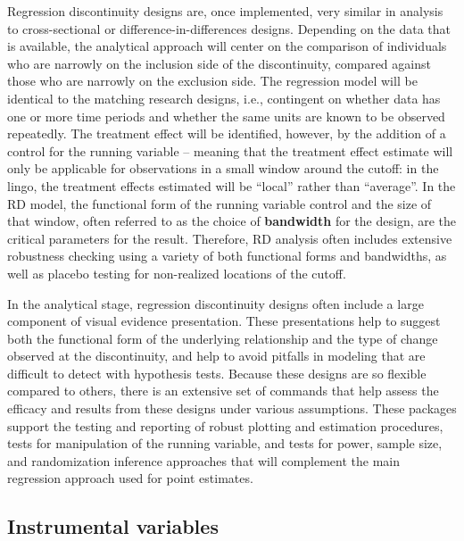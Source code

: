 Regression discontinuity designs are, once implemented,
very similar in analysis to cross-sectional or difference-in-differences designs.
Depending on the data that is available,
the analytical approach will center on the comparison of individuals
who are narrowly on the inclusion side of the discontinuity,
compared against those who are narrowly on the exclusion side.\cite{cattaneo2019}
The regression model will be identical to the matching research designs,
i.e., contingent on whether data has one or more time periods
and whether the same units are known to be observed repeatedly.
The treatment effect will be identified, however, by the addition of a control
for the running variable -- meaning that the treatment effect estimate
will only be applicable for observations in a small window around the cutoff:
in the lingo, the treatment effects estimated will be ``local'' rather than ``average''.
In the RD model, the functional form of the running variable control and the size of that window,
often referred to as the choice of \textbf{bandwidth} for the design,
are the critical parameters for the result.\cite{calonico2019regression}
Therefore, RD analysis often includes extensive robustness checking
using a variety of both functional forms and bandwidths,
as well as placebo testing for non-realized locations of the cutoff.

In the analytical stage, regression discontinuity designs
often include a large component of visual evidence presentation.
These presentations help to suggest both the functional form
of the underlying relationship and the type of change observed at the discontinuity,
and help to avoid pitfalls in modeling that are difficult to detect with hypothesis tests.\cite{pischke2018}
Because these designs are so flexible compared to others,
there is an extensive set of commands that help assess
the efficacy and results from these designs under various assumptions.\cite{calonico2014robust}
These packages support the testing and reporting
of robust plotting and estimation procedures,
tests for manipulation of the running variable,
and tests for power, sample size, and randomization inference approaches
that will complement the main regression approach used for point estimates.

\subsection{Instrumental variables}

